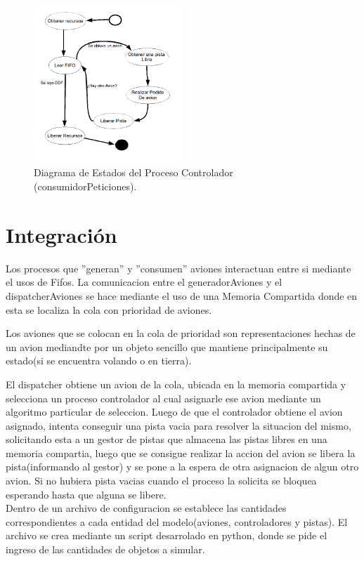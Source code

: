 \documentclass[a4paper,12pt,titlepage]{article}
\begin{document}
\begin{figure}
  \centering
    \includegraphics[width=0.5\textwidth] {dia_est-Controlador}
  \caption{Diagrama de Estados del Proceso Controlador (consumidorPeticiones).}
  \label{fig:dia_est_controlador}
\end{figure}




\newpage
\section{Integración}


Los procesos que ''generan'' y ''consumen'' aviones interactuan entre si mediante el usos de Fifos. La comunicacion entre el generadorAviones y el dispatcherAviones se hace mediante el uso de una Memoria Compartida donde en esta se localiza la cola con prioridad de aviones. 

Los aviones que se colocan en la cola de prioridad son representaciones hechas de un avion mediandte por un objeto sencillo que mantiene principalmente su estado(si se encuentra volando o en tierra).

El dispatcher obtiene un avion de la cola, ubicada en la memoria compartida y selecciona un proceso controlador al cual asignarle ese avion mediante un algoritmo particular de seleccion.
Luego de que el controlador obtiene el avion asignado, intenta conseguir una pista vacia para resolver la situacion del mismo, solicitando esta a un gestor de pistas que almacena las pistas libres en una memoria compartia, luego que se consigue realizar la accion del avion se libera la pista(informando al gestor) y se pone a la espera de otra asignacion de algun otro avion. Si no hubiera pista vacias cuando el proceso la solicita se bloquea esperando hasta que alguna se libere.\\


Dentro de un archivo de configuracion se establece las cantidades correspondientes a cada entidad del modelo(aviones, controladores y pistas). El archivo se crea mediante un script desarrolado en python, donde se pide el ingreso de las cantidades de objetos a simular.
\end{document}
